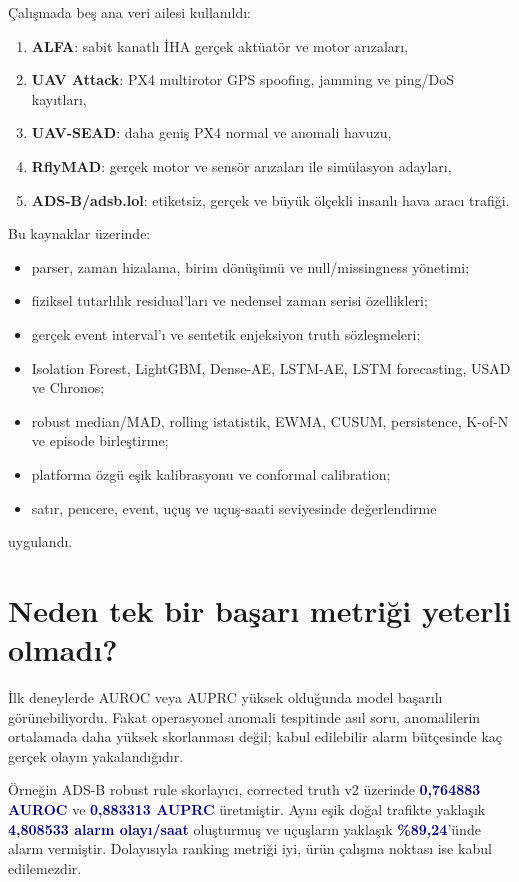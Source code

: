 \documentclass[11pt,a4paper,oneside]{report}
\newcommand{\metric}[1]{\textbf{\textcolor{Navy}{#1}}}
\begin{document}
Çalışmada beş ana veri ailesi kullanıldı:

\begin{enumerate}
  \item \textbf{ALFA}: sabit kanatlı İHA gerçek aktüatör ve motor arızaları,
  \item \textbf{UAV Attack}: PX4 multirotor GPS spoofing, jamming ve ping/DoS kayıtları,
  \item \textbf{UAV-SEAD}: daha geniş PX4 normal ve anomali havuzu,
  \item \textbf{RflyMAD}: gerçek motor ve sensör arızaları ile simülasyon adayları,
  \item \textbf{ADS-B/adsb.lol}: etiketsiz, gerçek ve büyük ölçekli insanlı hava aracı trafiği.
\end{enumerate}

Bu kaynaklar üzerinde:

\begin{itemize}
  \item parser, zaman hizalama, birim dönüşümü ve null/missingness yönetimi;
  \item fiziksel tutarlılık residual'ları ve nedensel zaman serisi özellikleri;
  \item gerçek event interval'ı ve sentetik enjeksiyon truth sözleşmeleri;
  \item Isolation Forest, LightGBM, Dense-AE, LSTM-AE, LSTM forecasting,
  USAD ve Chronos;
  \item robust median/MAD, rolling istatistik, EWMA, CUSUM, persistence,
  K-of-N ve episode birleştirme;
  \item platforma özgü eşik kalibrasyonu ve conformal calibration;
  \item satır, pencere, event, uçuş ve uçuş-saati seviyesinde değerlendirme
\end{itemize}

uygulandı.

\section{Neden tek bir başarı metriği yeterli olmadı?}

İlk deneylerde AUROC veya AUPRC yüksek olduğunda model başarılı görünebiliyordu.
Fakat operasyonel anomali tespitinde asıl soru, anomalilerin ortalamada daha
yüksek skorlanması değil; kabul edilebilir alarm bütçesinde kaç gerçek olayın
yakalandığıdır.

Örneğin ADS-B robust rule skorlayıcı, corrected truth v2 üzerinde
\metric{0,764883 AUROC} ve \metric{0,883313 AUPRC} üretmiştir. Aynı eşik doğal
trafikte yaklaşık \metric{4,808533 alarm olayı/saat} oluşturmuş ve uçuşların
yaklaşık \metric{\%89,24}'ünde alarm vermiştir. Dolayısıyla ranking metriği iyi,
ürün çalışma noktası ise kabul edilemezdir.
\end{document}
